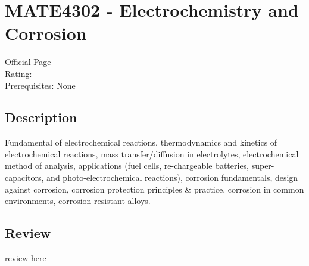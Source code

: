 \hypertarget{MATE4302}{\section{MATE4302 - Electrochemistry and Corrosion}}

\large
\textcolor{turbo_purple}{\href{https://my.uq.edu.au/programs-courses/course.html?course_code=MATE4302}{Official Page}} \\
Rating: \cstar\cstar\cstar\cstar\ostar \\
Prerequisites: None

\normalsize
\subsection*{Description}
Fundamental of electrochemical reactions, thermodynamics and kinetics of electrochemical reactions, mass transfer/diffusion in electrolytes, electrochemical method of analysis, applications (fuel cells, re-chargeable batteries, super-capacitors, and photo-electrochemical reactions), corrosion fundamentals, design against corrosion, corrosion protection principles \& practice, corrosion in common environments, corrosion resistant alloys.

\subsection*{Review}
review here
